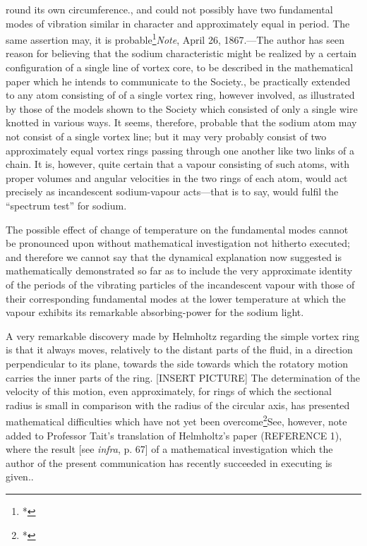 round its own circumference., and could not possibly have two fundamental modes
of vibration similar in character and approximately equal in period. The same
assertion may, it is probable\footnote{*}{{\it Note}, April 26, 1867.---The
author has seen reason for believing that the sodium characteristic might be
realized by a certain configuration of a single line of vortex core, to be
described in the mathematical paper which he intends to communicate to the
Society.}, be practically extended to any atom consisting of of a single vortex
ring, however involved, as illustrated by those of the models shown to the
Society which consisted of only a single wire knotted in various ways. It
seems, therefore, probable that the sodium atom may not consist of a single
vortex line; but it may very probably consist of two approximately equal vortex
rings passing through one another like two links of a chain. It is, however,
quite certain that a vapour consisting of such atoms, with proper volumes and
angular velocities in the two rings of each atom, would act precisely as
incandescent sodium-vapour acts---that is to say, would fulfil the ``spectrum
test'' for sodium.

The possible effect of change of temperature on the fundamental modes cannot be
pronounced upon without mathematical investigation not hitherto executed; and
therefore we cannot say that the dynamical explanation now suggested is
mathematically demonstrated so far as to include the very approximate identity
of the periods of the vibrating particles of the incandescent vapour with those
of their corresponding fundamental modes at the lower temperature at which the
vapour exhibits its remarkable absorbing-power for the sodium light.

A very remarkable discovery made by Helmholtz regarding the simple vortex ring
is that it always moves, relatively to the distant parts of the fluid, in a
direction perpendicular to its plane, towards the side towards which the
rotatory motion carries the inner parts of the ring. [INSERT PICTURE] The
determination of the velocity of this motion, even approximately, for rings of
which the sectional radius is small in comparison with the radius of the
circular axis, has presented mathematical difficulties which have not yet been
overcome\footnote{*}{See, however, note added to Professor Tait's translation
of Helmholtz's paper (REFERENCE 1), where the result [see {\it infra}, p. 67]
of a mathematical investigation which the author of the present communication
has recently succeeded in executing is given.}.

\bye
